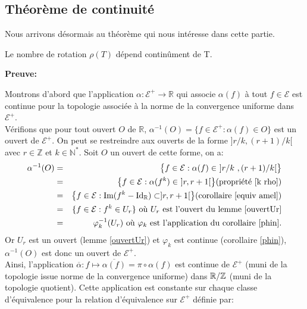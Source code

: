 \subsection{Théorème de continuité}
Nous arrivons désormais au théorème qui nous intéresse dans cette partie.

\begin{theorem}
	Le nombre de rotation $\rho(T)$ dépend continûment de T.
\end{theorem}

	\textbf{Preuve:}
	\par Montrons d'abord que l'application $\alpha: \mathcal{E}^+ \to \mathbb{R}$ qui associe $\alpha(f)$ à tout $f \in \mathcal{E}$ est continue pour la topologie associée à la norme de la convergence uniforme dans $\mathcal{E}^+$.\\
	Vérifions que pour tout ouvert $O$ de $\mathbb{R}$, $\alpha^{-1}(O)= \lbrace f \in \mathcal{E}^+: \alpha(f) \in O\rbrace$ est un ouvert de $ \mathcal{E}^+ $. On peut se restreindre aux ouverts de la forme $]r/k,(r+1)/k[$ avec $r \in \mathbb{Z}$ et $k \in \mathbb{N}^*$. Soit $O$ un ouvert de cette forme, on a:
	\begin{eqnarray*}
		\alpha^{-1}(O)&=&\big\lbrace f \in \mathcal{E}: \alpha(f) \in \ ]r/k \ , (r+1)/k[ \big\rbrace \\
		&=& \big\lbrace f \in \mathcal{E}: \alpha(f^k) \in \ ]r , r+1 [ \big\rbrace (\text{propriété } \ref{k rho})\\
		&=& \big\lbrace f \in \mathcal{E}: \text{Im}(f^k - \mathrm{Id_{\mathbb{R}}}) \subset ]r,r+1[ \big\rbrace (\text{corollaire } \ref{equiv amel})\\
		&=& \lbrace  f \in \mathcal{E}: f^k \in U_r \rbrace \text{ où } U_r \text{ est l'ouvert du lemme } \ref{ouvertUr}\\
		&=& \varphi_k^{-1}(U_r) \text{ où }\varphi_k \text{ est l'application du corollaire } \ref{phin}.
	\end{eqnarray*}
	Or $U_r$ est un ouvert (lemme \ref{ouvertUr}) et $\varphi_k$ est continue (corollaire \ref{phin}), $\alpha^{-1}(O)$ est donc un ouvert de $\mathcal{E}^+$. \\


	Ainsi, l'application $\overline{\alpha}:f\mapsto \overline{\alpha(f)}= \pi\circ \alpha (f)$ est continue de $\mathcal{E}^+$ (muni de la topologie issue norme de la convergence uniforme) dans ${\mathbb{R}}/\mathbb{Z}$ (muni de la topologie quotient). Cette application est constante sur chaque classe d'équivalence pour la relation d'équivalence sur $\mathcal{E}^+$ définie par:

